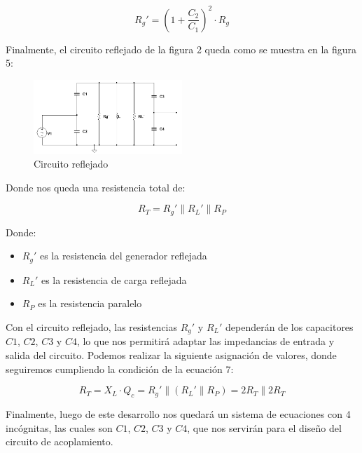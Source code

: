 \begin{equation}
    R_g' = (1 + \frac{C_2}{C_1})^2 \cdot R_g
\end{equation}

Finalmente, el circuito reflejado de la figura 2 queda como se muestra en la figura 5:

\begin{figure}[h]
    \centering
    \includegraphics[width=0.5\textwidth]{Imagenes/circuito_reflejado.png}
    \caption{Circuito reflejado}
\end{figure}

Donde nos queda una resistencia total de:

\begin{equation}
    R_T = R_g' \parallel R_L' \parallel R_P
\end{equation}

Donde:

\begin{itemize}
    \item $R_g'$ es la resistencia del generador reflejada
    \item $R_L'$ es la resistencia de carga reflejada
    \item $R_P$ es la resistencia paralelo
\end{itemize}

Con el circuito reflejado, las resistencias $R_g'$ y $R_L'$ dependerán de los capacitores $C1$, $C2$, $C3$ y $C4$, lo que nos permitirá adaptar las impedancias de entrada y salida del circuito.
Podemos realizar la siguiente asignación de valores, donde seguiremos cumpliendo la condición de la ecuación 7:

\begin{equation}
    R_T = X_L \cdot Q_c = R_g' \parallel (R_L' \parallel R_P) = 2 R_T \parallel 2 R_T 
\end{equation}

Finalmente, luego de este desarrollo nos quedará un sistema de ecuaciones con 4 incógnitas, las cuales son $C1$, $C2$, $C3$ y $C4$, que nos servirán para el diseño del circuito de acoplamiento.


